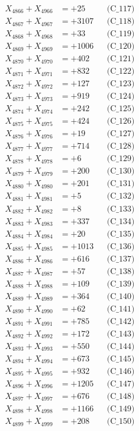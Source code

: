 \documentclass[a4paper,10pt]{article}
\begin{document}
{\begin{align}
X_{4866} + X_{4966} &= +25 && \text{(C\_117)} \\
X_{4867} + X_{4967} &= +3107 && \text{(C\_118)} \\
X_{4868} + X_{4968} &= +33 && \text{(C\_119)} \\
X_{4869} + X_{4969} &= +1006 && \text{(C\_120)} \\
\allowbreak
X_{4870} + X_{4970} &= +402 && \text{(C\_121)} \\
X_{4871} + X_{4971} &= +832 && \text{(C\_122)} \\
X_{4872} + X_{4972} &= +127 && \text{(C\_123)} \\
X_{4873} + X_{4973} &= +919 && \text{(C\_124)} \\
X_{4874} + X_{4974} &= +242 && \text{(C\_125)} \\
\allowbreak
X_{4875} + X_{4975} &= +424 && \text{(C\_126)} \\
X_{4876} + X_{4976} &= +19 && \text{(C\_127)} \\
X_{4877} + X_{4977} &= +714 && \text{(C\_128)} \\
X_{4878} + X_{4978} &= +6 && \text{(C\_129)} \\
X_{4879} + X_{4979} &= +200 && \text{(C\_130)} \\
\allowbreak
X_{4880} + X_{4980} &= +201 && \text{(C\_131)} \\
X_{4881} + X_{4981} &= +5 && \text{(C\_132)} \\
X_{4882} + X_{4982} &= +8 && \text{(C\_133)} \\
X_{4883} + X_{4983} &= +337 && \text{(C\_134)} \\
X_{4884} + X_{4984} &= +20 && \text{(C\_135)} \\
\allowbreak
X_{4885} + X_{4985} &= +1013 && \text{(C\_136)} \\
X_{4886} + X_{4986} &= +616 && \text{(C\_137)} \\
X_{4887} + X_{4987} &= +57 && \text{(C\_138)} \\
X_{4888} + X_{4988} &= +109 && \text{(C\_139)} \\
X_{4889} + X_{4989} &= +364 && \text{(C\_140)} \\
\allowbreak
X_{4890} + X_{4990} &= +62 && \text{(C\_141)} \\
X_{4891} + X_{4991} &= +785 && \text{(C\_142)} \\
X_{4892} + X_{4992} &= +172 && \text{(C\_143)} \\
X_{4893} + X_{4993} &= +550 && \text{(C\_144)} \\
X_{4894} + X_{4994} &= +673 && \text{(C\_145)} \\
\allowbreak
X_{4895} + X_{4995} &= +932 && \text{(C\_146)} \\
X_{4896} + X_{4996} &= +1205 && \text{(C\_147)} \\
X_{4897} + X_{4997} &= +676 && \text{(C\_148)} \\
X_{4898} + X_{4998} &= +1166 && \text{(C\_149)} \\
X_{4899} + X_{4999} &= +208 && \text{(C\_150)} \\
\end{align}
}
\end{document}
